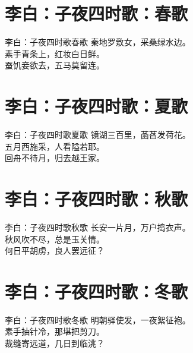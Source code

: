 \documentclass[12pt,oneside,a5paper]{book}
\begin{document}
\chapter{李白：子夜四时歌：春歌}
\begin{poemzh}{李白：子夜四时歌}{春歌}
秦地罗敷女，采桑绿水边。\\
素手青条上，红妆白日鲜。\\
蚕饥妾欲去，五马莫留连。\\ 
\end{poemzh}

\chapter{李白：子夜四时歌：夏歌}
\begin{poemzh}{李白：子夜四时歌}{夏歌}
镜湖三百里，菡萏发荷花。\\
五月西施采，人看隘若耶。\\
回舟不待月，归去越王家。\\ 
\end{poemzh}

\chapter{李白：子夜四时歌：秋歌}
\begin{poemzh}{李白：子夜四时歌}{秋歌}
长安一片月，万户捣衣声。\\
秋风吹不尽，总是玉关情。\\
何日平胡虏，良人罢远征？\\ 
\end{poemzh}

\chapter{李白：子夜四时歌：冬歌}
\begin{poemzh}{李白：子夜四时歌}{冬歌}
明朝驿使发，一夜絮征袍。\\
素手抽针冷，那堪把剪刀。\\
裁缝寄远道，几日到临洮？\\ 
\end{poemzh}
\end{document}

